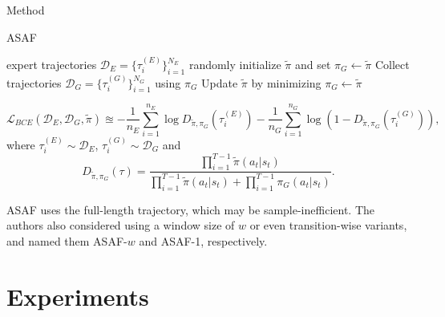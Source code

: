 \documentclass[10pt,aspectratio=169]{beamer}
\begin{document}
\begin{frame}{Method}
	\begin{algorithm}[H]
		\caption{ASAF}
		\label{algo:asaf}
		\begin{algorithmic}
			\REQUIRE expert trajectories $\mathcal{D}_E = \{\tau_i^{(E)}\}_{i=1}^{N_E}$
			\STATE randomly initialize $\tilde{\pi}$ and set $\pi_G \gets \tilde{\pi}$
			\STATE Collect trajectories $\mathcal{D}_G = \{\tau_i^{(G)}\}^{N_G}_{i=1}$ using $\pi_G$
			\STATE Update $\tilde{\pi}$ by minimizing 
			\STATE $\pi_G \gets \tilde{\pi}$
			\ENDFOR
		\end{algorithmic}
	\end{algorithm}

	\begin{equation}\label{equ:2}
		\mathcal{L}_{BCE}(\mathcal{D}_E,\mathcal{D}_G, \tilde{\pi}) \approxeq -\frac{1}{n_E}\sum_{i=1}^{n_E}\log D_{\tilde{\pi}, \pi_G}(\tau_i^{(E)})-\frac{1}{n_G}\sum_{i=1}^{n_G}\log\left(1- D_{\tilde{\pi}, \pi_G}(\tau_i^{(G)})\right),
	\end{equation}
	where $\tau_i^{(E)} \sim \mathcal{D}_E$, $\tau_i^{(G)} \sim \mathcal{D}_G$ and
	\begin{equation}\label{equ:emp_d}
		D_{\tilde{\pi}, \pi_G}(\tau) = \frac{\prod_{i=1}^{T-1}\tilde{\pi}(a_t|s_t)}{\prod_{i=1}^{T-1}\tilde{\pi}(a_t|s_t) + \prod_{i=1}^{T-1}\pi_G(a_t|s_t)}.
	\end{equation}

    \begin{remark}
		ASAF uses the full-length trajectory, which may be sample-inefficient. The authors also considered using a window size of $w$ or even transition-wise variants, and named them ASAF-$w$ and ASAF-1, respectively.
	\end{remark}
\end{frame}

\section{Experiments}
\end{document}
